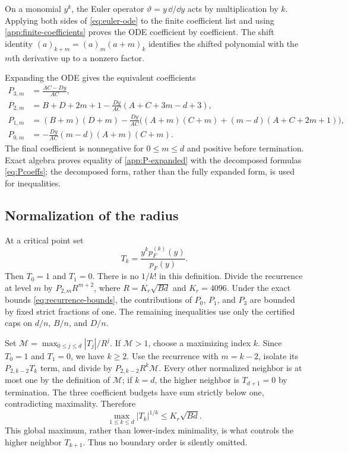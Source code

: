 On a monomial $y^k$, the Euler operator $\vartheta=y\,\dd/\dd y$ acts by
multiplication by $k$.  Applying both sides of \eqref{eq:euler-ode} to the
finite coefficient list and using \eqref{app:finite-coefficients} proves the
ODE coefficient by coefficient.  The shift identity
$(a)_{k+m}=(a)_m(a+m)_k$ identifies the shifted polynomial with the $m$th
derivative up to a nonzero factor.

Expanding the ODE gives the equivalent coefficients
\begin{align}
 P_{3,m}&=\frac{AC-Dy}{AC},\nonumber\\
 P_{2,m}&=B+D+2m+1
 -\frac{Dy}{AC}(A+C+3m-d+3),\nonumber\\
 P_{1,m}&=(B+m)(D+m)
 -\frac{Dy}{AC}\bigl((A+m)(C+m)
 +(m-d)(A+C+2m+1)\bigr),\label{app:P-expanded}\\
 P_{0,m}&=-\frac{Dy}{AC}(m-d)(A+m)(C+m).\nonumber
\end{align}
The final coefficient is nonnegative for $0\le m\le d$ and positive before
termination.  Exact algebra proves equality of \eqref{app:P-expanded} with
the decomposed formulas \eqref{eq:Pcoeffs}; the decomposed form, rather than
the fully expanded form, is used for inequalities.

\subsection{Normalization of the radius}

At a critical point set
\[
 T_k=\frac{y^kp_F^{(k)}(y)}{p_F(y)}.
\]
Then $T_0=1$ and $T_1=0$.  There is no $1/k!$ in this definition.  Divide
the recurrence at level $m$ by $P_{2,m}R^{m+2}$, where
$R=K_r\sqrt{Bd}$ and $K_r=4096$.  Under the exact bounds
\eqref{eq:recurrence-bounds}, the contributions of $P_0$, $P_1$, and $P_3$
are bounded by fixed strict fractions of one.  The remaining inequalities
use only the certified caps on $d/n$, $B/n$, and $D/n$.

Set $\mathcal M=\max_{0\le j\le d}|T_j|/R^j$.  If $\mathcal M>1$, choose a
maximizing index $k$.  Since $T_0=1$ and $T_1=0$, we have $k\ge2$.  Use the
recurrence with $m=k-2$, isolate its $P_{2,k-2}T_k$ term, and divide by
$P_{2,k-2}R^k\mathcal M$.  Every other normalized neighbor is at most one by
the definition of $\mathcal M$; if $k=d$, the higher neighbor is
$T_{d+1}=0$ by termination.  The three coefficient budgets have sum strictly
below one, contradicting maximality.  Therefore
\[
 \max_{1\le k\le d}|T_k|^{1/k}\le K_r\sqrt{Bd}.
\]
This global maximum, rather than lower-index minimality, is what controls the
higher neighbor $T_{k+1}$.  Thus no boundary order is silently omitted.

